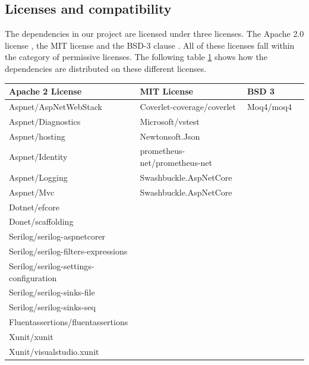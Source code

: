 \documentclass{article}
\begin{document}
\subsection{Licenses and compatibility}
The dependencies in our project are licensed under three licenses. The Apache 2.0 license \cite{apache}, the MIT license \cite{MIT} and the BSD-3 clause  \cite{BSD}. All of these licenses fall within the category of permissive licenses. 
The following table \ref{table:lic} shows how the dependencies are distributed on these different licenses. 
\begin{table}[H]
    \small
    \begin{tabular}{|l|l|l|l|}
        \hline
        Apache 2 License                            & MIT License                 & BSD 3      \\ \hline
       Aspnet/AspNetWebStack                  & Coverlet-coverage/coverlet    & Moq4/moq4      \\
       Aspnet/Diagnostics                     & Microsoft/vstest              &                \\
       Aspnet/hosting                         & Newtonsoft.Json               &                \\
       Aspnet/Identity                        & prometheus-net/prometheus-net &                \\
       Aspnet/Logging                         & Swashbuckle.AspNetCore        &                \\
       Aspnet/Mvc                             & Swashbuckle.AspNetCore        &                \\
       Dotnet/efcore                          &                               &                \\
       Donet/scaffolding                      &                               &                \\
       Serilog/serilog-aspnetcorer            &                               &                \\
       Serilog/serilog-filters-expressions    &                               &                \\
       Serilog/serilog-settings-configuration &                               &                \\
       Serilog/serilog-sinks-file             &                               &                \\
       Serilog/serilog-sinks-seq              &                               &                \\
       Fluentassertions/fluentassertions      &                               &                \\
       Xunit/xunit                            &                               &                \\
       Xunit/visualstudio.xunit               &                               &                \\
                                                                                                \hline
    \end{tabular}
    \label{table:lic}
\end{table}
\end{document}
